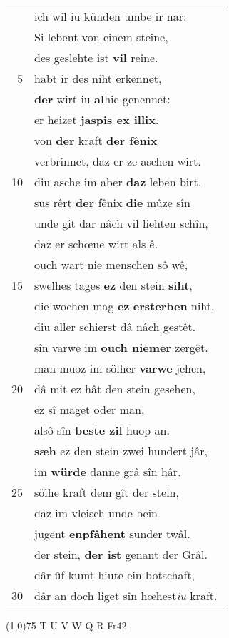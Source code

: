 \documentclass[8pt,a4paper,notitlepage]{article}
\begin{document}
\begin{table}[ht]
\begin{minipage}[t]{0.5\linewidth}
\begin{tabular}{rl}
 & ich wil iu künden umbe ir nar:\\ 
 & Si lebent von einem steine,\\ 
 & des geslehte ist \textbf{vil} reine.\\ 
5 & habt ir des niht erkennet,\\ 
 & \textbf{der} wirt iu \textbf{al}hie genennet:\\ 
 & er heizet \textbf{jaspis ex illix}.\\ 
 & von \textbf{der} kraft \textbf{der fênix}\\ 
 & verbrinnet, daz er ze aschen wirt.\\ 
10 & diu asche im aber \textbf{daz} leben birt.\\ 
 & sus rêrt \textbf{der} fênix \textbf{die} mûze sîn\\ 
 & unde gît dar nâch vil liehten schîn,\\ 
 & daz er schœne wirt als ê.\\ 
 & ouch wart nie menschen sô wê,\\ 
15 & swelhes tages \textbf{ez} den stein \textbf{siht},\\ 
 & die wochen mag \textbf{ez} \textbf{ersterben} niht,\\ 
 & diu aller schierst dâ nâch gestêt.\\ 
 & sîn varwe im \textbf{ouch niemer} zergêt.\\ 
 & man muoz im sölher \textbf{varwe} jehen,\\ 
20 & dâ mit ez hât den stein gesehen,\\ 
 & ez sî maget oder man,\\ 
 & alsô sîn \textbf{beste zil} huop an.\\ 
 & \textbf{sæh} ez den stein zwei hundert jâr,\\ 
 & im \textbf{würde} danne grâ sîn hâr.\\ 
25 & sölhe kraft dem gît der stein,\\ 
 & daz im vleisch unde bein\\ 
 & jugent \textbf{enpfâhent} sunder twâl.\\ 
 & der stein, \textbf{der ist} genant der Grâl.\\ 
 & dâr ûf kumt hiute ein botschaft,\\ 
30 & dâr an doch liget sîn hœhest\textit{iu} kraft.\\ 
\end{tabular}
\scriptsize
\line(1,0){75} \newline
T U V W Q R Fr42 \newline

\end{minipage}
\end{table}
\end{document}
